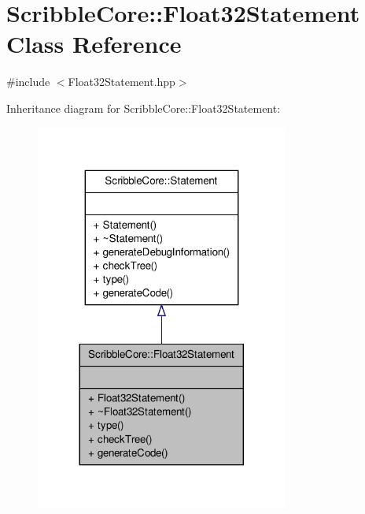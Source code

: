 \hypertarget{class_scribble_core_1_1_float32_statement}{\section{Scribble\-Core\-:\-:Float32\-Statement Class Reference}
\label{class_scribble_core_1_1_float32_statement}
}


{\ttfamily \#include $<$Float32\-Statement.\-hpp$>$}



Inheritance diagram for Scribble\-Core\-:\-:Float32\-Statement\-:
\nopagebreak
\begin{figure}[H]
\begin{center}
\leavevmode
\includegraphics[width=236pt]{class_scribble_core_1_1_float32_statement__inherit__graph}
\end{center}
\end{figure}


